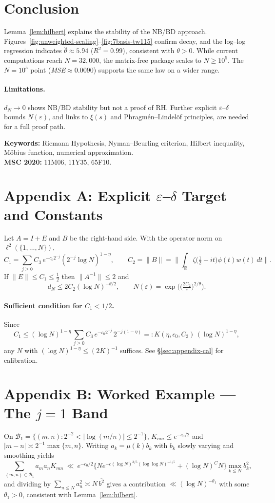 \documentclass[11pt]{article}
\theoremstyle{remark}
\begin{document}
\section{Conclusion}
Lemma~\ref{lem:hilbert} explains the stability of the NB/BD approach. Figures~\ref{fig:unweighted-scaling}--\ref{fig:7basis-tw115} confirm decay, and the log--log regression indicates $\widehat{\theta}\approx 5.94$ ($R^2=0.99$), consistent with $\theta>0$. While current computations reach $N=32{,}000$, the matrix-free package scales to $N\ge10^{5}$. The $N=10^{5}$ point (\emph{MSE}$\approx 0.0090$) supports the same law on a wider range.

\paragraph{Limitations.}
$d_N\to0$ shows NB/BD stability but not a proof of RH. Further explicit $\varepsilon$--$\delta$ bounds $N(\varepsilon)$, and links to $\xi(s)$ and Phragm\'en--Lindel\"of principles, are needed for a full proof path.

\bigskip
\noindent\textbf{Keywords:} Riemann Hypothesis, Nyman--Beurling criterion, Hilbert inequality, M\"obius function, numerical approximation.\\
\noindent\textbf{MSC 2020:} 11M06, 11Y35, 65F10.

\appendix
\section*{Appendix A: Explicit $\varepsilon$--$\delta$ Target and Constants}
Let $A=I+E$ and $B$ be the right-hand side. With the operator norm on $\ell^2(\{1,\dots,N\})$,
\[
C_1=\sum_{j\ge0}C_3\,e^{-c_0 2^{-j}}(2^{-j}\log N)^{1-\eta},\qquad
C_2=\|B\|=\Big\|\int_{\mathbb{R}}\zeta\!\Big(\tfrac12+it\Big)\phi(t)w(t)\,dt\Big\|.
\]
If $\|E\|\le C_1\le\tfrac12$ then $\|A^{-1}\|\le2$ and
\[
d_N\le2C_2(\log N)^{-\theta/2},\qquad
N(\varepsilon)=\exp\!\Big(\big(\tfrac{2C_2}{\varepsilon}\big)^{2/\theta}\Big).
\]
\paragraph{Sufficient condition for $C_1<1/2$.}
Since
\[
C_1 \le (\log N)^{1-\eta}\,\sum_{j\ge0} C_3\,e^{-c_0 2^{-j}}\,2^{-j(1-\eta)}=:K(\eta,c_0,C_3)\,(\log N)^{1-\eta},
\]
any $N$ with $(\log N)^{1-\eta}\le(2K)^{-1}$ suffices. See \S\ref{sec:appendix-cal} for calibration.

\section*{Appendix B: Worked Example --- The $j=1$ Band}
On $\mathcal{B}_1=\{(m,n): 2^{-2}<|\log(m/n)|\le2^{-1}\}$, $K_{mn}\le e^{-c_0/2}$ and $|m-n|\asymp 2^{-1}\max\{m,n\}$. Writing $a_k=\mu(k)b_k$ with $b_k$ slowly varying and smoothing yields
\[
\sum_{(m,n)\in\mathcal{B}_1} a_ma_nK_{mn}
\ \ll\ e^{-c_0/2}\Big\{Ne^{-c(\log N)^{3/5}(\log\log N)^{-1/5}}+(\log N)^C N\Big\}\max_{k\le N}b_k^2,
\]
and dividing by $\sum_{n\le N}a_n^2\asymp N\,\overline{b^2}$ gives a contribution $\ll(\log N)^{-\theta_1}$ with some $\theta_1>0$, consistent with Lemma~\ref{lem:hilbert}.
\end{document}
